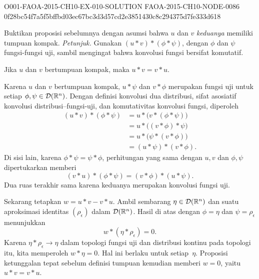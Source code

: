 \begin{o001solution}
  {O001-FAOA-2015-CH10-EX-010-SOLUTION}
  {FAOA-2015-CH10-NODE-0086}
  {0f28bc54f7a5f5bffbd03ec67bc3d3d57cd2e3851430c8c294375d7fe333d618}
\begin{o001statement}
Buktikan proposisi sebelumnya dengan asumsi bahwa $u$ dan $v$ \emph{keduanya} memiliki tumpuan kompak. \emph{Petunjuk.}
Gunakan $(u \ast v) \ast (\phi \ast \psi)$, dengan $\phi$ dan $\psi$ fungsi-fungsi uji, sambil mengingat bahwa konvolusi fungsi
bersifat komutatif.
\end{o001statement}
\begin{o001answer}
Jika $u$ dan $v$ bertumpuan kompak, maka $u\ast v=v\ast u$.
\end{o001answer}
\begin{o001proof}
Karena $u$ dan $v$ bertumpuan kompak, $u\ast\psi$ dan $v\ast\phi$
merupakan fungsi uji untuk setiap $\phi,\psi\in\mathcal{D}(\mathbb{R}^n)$. Dengan definisi
konvolusi dua distribusi, sifat asosiatif konvolusi distribusi--fungsi-uji,
dan komutativitas konvolusi fungsi, diperoleh
\begin{align*}
 (u\ast v)\ast(\phi\ast\psi)
 &=u\ast\bigl(v\ast(\phi\ast\psi)\bigr)\\
 &=u\ast\bigl((v\ast\phi)\ast\psi\bigr)\\
 &=u\ast\bigl(\psi\ast(v\ast\phi)\bigr)\\
 &=(u\ast\psi)\ast(v\ast\phi).
\end{align*}
Di sisi lain, karena $\phi\ast\psi=\psi\ast\phi$, perhitungan yang sama
dengan $u,v$ dan $\phi,\psi$ dipertukarkan memberi
\[
 (v\ast u)\ast(\phi\ast\psi)
 =(v\ast\phi)\ast(u\ast\psi).
\]
Dua ruas terakhir sama karena keduanya merupakan konvolusi fungsi uji.

Sekarang tetapkan $w=u\ast v-v\ast u$. Ambil sembarang
$\eta\in\mathcal{D}(\mathbb{R}^n)$ dan suatu aproksimasi identitas
$(\rho_\epsilon)$ dalam $\mathcal{D}(\mathbb{R}^n)$. Hasil di atas dengan
$\phi=\eta$ dan $\psi=\rho_\epsilon$ menunjukkan
\[
 w\ast(\eta\ast\rho_\epsilon)=0.
\]
Karena $\eta\ast\rho_\epsilon\to\eta$ dalam topologi fungsi uji dan distribusi
kontinu pada topologi itu, kita memperoleh $w\ast\eta=0$. Hal ini berlaku
untuk setiap~$\eta$. Proposisi ketunggalan tepat sebelum definisi tumpuan
kemudian memberi $w=0$, yaitu $u\ast v=v\ast u$.
\end{o001proof}
\end{o001solution}

